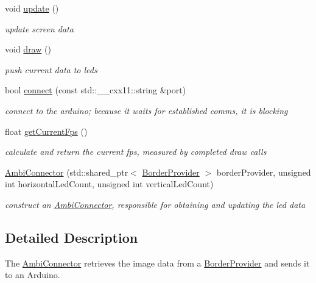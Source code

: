 \begin{DoxyCompactItemize}
\item 
void \hyperlink{classAmbiConnector_af12c0b2034feb3016279672449009ae2}{update} ()\hypertarget{classAmbiConnector_af12c0b2034feb3016279672449009ae2}{}\label{classAmbiConnector_af12c0b2034feb3016279672449009ae2}

\begin{DoxyCompactList}\small\item\em update screen data \end{DoxyCompactList}\item 
void \hyperlink{classAmbiConnector_a9298de50c73e9dfd204baccc4fc1afab}{draw} ()\hypertarget{classAmbiConnector_a9298de50c73e9dfd204baccc4fc1afab}{}\label{classAmbiConnector_a9298de50c73e9dfd204baccc4fc1afab}

\begin{DoxyCompactList}\small\item\em push current data to leds \end{DoxyCompactList}\item 
bool \hyperlink{classAmbiConnector_ab093d68899b581349a0e2479c25da2ca}{connect} (const std\+::\+\_\+\+\_\+cxx11\+::string \&port)
\begin{DoxyCompactList}\small\item\em connect to the arduino; because it waits for established comms, it is blocking \end{DoxyCompactList}\item 
float \hyperlink{classAmbiConnector_acfd5219af9b1c1d7d7dfdfac420c970a}{get\+Current\+Fps} ()
\begin{DoxyCompactList}\small\item\em calculate and return the current fps, measured by completed draw calls \end{DoxyCompactList}\item 
\hyperlink{classAmbiConnector_a72b592fc07d3b3ea297d00cb9b87b1bc}{Ambi\+Connector} (std\+::shared\+\_\+ptr$<$ \hyperlink{classBorderProvider}{Border\+Provider} $>$ border\+Provider, unsigned int horizontal\+Led\+Count, unsigned int vertical\+Led\+Count)
\begin{DoxyCompactList}\small\item\em construct an \hyperlink{classAmbiConnector}{Ambi\+Connector}, responsible for obtaining and updating the led data \end{DoxyCompactList}\end{DoxyCompactItemize}


\subsection{Detailed Description}
The \hyperlink{classAmbiConnector}{Ambi\+Connector} retrieves the image data from a \hyperlink{classBorderProvider}{Border\+Provider} and sends it to an Arduino. 

